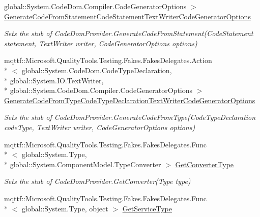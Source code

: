 \begin{DoxyCompactItemize}
global\-::\-System.\-Code\-Dom.\-Compiler.\-Code\-Generator\-Options $>$ \hyperlink{class_system_1_1_code_dom_1_1_compiler_1_1_fakes_1_1_stub_code_dom_provider_a0f813325b50e2029239399ecd7641d91}{Generate\-Code\-From\-Statement\-Code\-Statement\-Text\-Writer\-Code\-Generator\-Options}
\begin{DoxyCompactList}\small\item\em Sets the stub of Code\-Dom\-Provider.\-Generate\-Code\-From\-Statement(\-Code\-Statement statement, Text\-Writer writer, Code\-Generator\-Options options)\end{DoxyCompactList}\item 
mqttf\-::\-Microsoft.\-Quality\-Tools.\-Testing.\-Fakes.\-Fakes\-Delegates.\-Action\\*
$<$ global\-::\-System.\-Code\-Dom.\-Code\-Type\-Declaration, \\*
global\-::\-System.\-I\-O.\-Text\-Writer, \\*
global\-::\-System.\-Code\-Dom.\-Compiler.\-Code\-Generator\-Options $>$ \hyperlink{class_system_1_1_code_dom_1_1_compiler_1_1_fakes_1_1_stub_code_dom_provider_a1b709892dc0772bd2ccbb997f96e3467}{Generate\-Code\-From\-Type\-Code\-Type\-Declaration\-Text\-Writer\-Code\-Generator\-Options}
\begin{DoxyCompactList}\small\item\em Sets the stub of Code\-Dom\-Provider.\-Generate\-Code\-From\-Type(\-Code\-Type\-Declaration code\-Type, Text\-Writer writer, Code\-Generator\-Options options)\end{DoxyCompactList}\item 
mqttf\-::\-Microsoft.\-Quality\-Tools.\-Testing.\-Fakes.\-Fakes\-Delegates.\-Func\\*
$<$ global\-::\-System.\-Type, \\*
global\-::\-System.\-Component\-Model.\-Type\-Converter $>$ \hyperlink{class_system_1_1_code_dom_1_1_compiler_1_1_fakes_1_1_stub_code_dom_provider_a3ba8a4f6dff6648166e1cce2732b4461}{Get\-Converter\-Type}
\begin{DoxyCompactList}\small\item\em Sets the stub of Code\-Dom\-Provider.\-Get\-Converter(\-Type type)\end{DoxyCompactList}\item 
mqttf\-::\-Microsoft.\-Quality\-Tools.\-Testing.\-Fakes.\-Fakes\-Delegates.\-Func\\*
$<$ global\-::\-System.\-Type, object $>$ \hyperlink{class_system_1_1_code_dom_1_1_compiler_1_1_fakes_1_1_stub_code_dom_provider_a185fa982ef15a4c32292b35b5979ba0f}{Get\-Service\-Type}

\end{DoxyCompactItemize}
